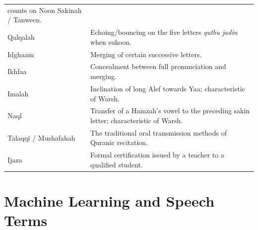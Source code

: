 \begin{table}[H]
\begin{tabular}{lp{9cm}}
                                     counts on Noon Sakinah / Tanween. \\
    Qalqalah                        & Echoing/bouncing on the five letters
                                     \emph{qutbu jadin} when sukoon. \\
    Idghaam                         & Merging of certain successive
                                     letters. \\
    Ikhfaa                          & Concealment between full
                                     pronunciation and merging. \\
    Imalah                          & Inclination of long Alef
                                     towards Yaa; characteristic of
                                     Warsh. \\
    Naql                            & Transfer of a Hamzah's vowel to
                                     the preceding sakin letter;
                                     characteristic of Warsh. \\
    Talaqqi / Mushafahah            & The traditional oral transmission
                                     methods of Quranic recitation. \\
    Ijaza                           & Formal certification issued by a
                                     teacher to a qualified student. \\
    \bottomrule
  \end{tabular}
\end{table}

\section{Machine Learning and Speech Terms}

